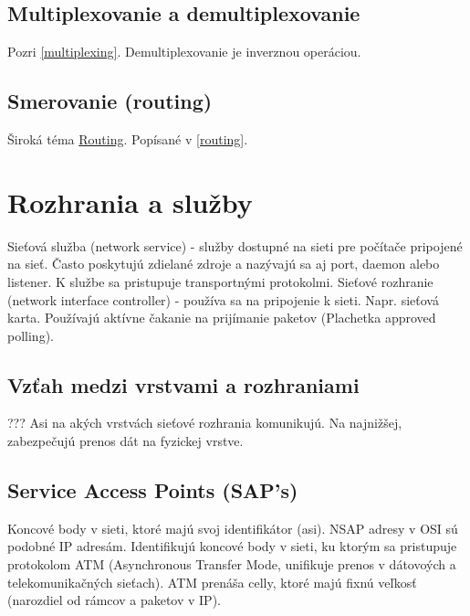 \documentclass[10pt,a4paper]{article}
\begin{document}
\subsection{Multiplexovanie a demultiplexovanie}  
Pozri \ref{multiplexing}. Demultiplexovanie je inverznou operáciou. 

\subsection{Smerovanie (routing)}   
Široká téma \href{http://en.wikipedia.org/wiki/Routing}{Routing}. 
Popísané v \ref{routing}.
              
                                                         
\section{Rozhrania a služby}                
Sieťová služba (network service) - služby dostupné na sieti pre počítače pripojené na sieť. Často poskytujú zdielané zdroje a nazývajú sa aj port, daemon alebo listener.  K službe sa pristupuje transportnými protokolmi. 
Sieťové rozhranie (network interface controller) - používa sa na pripojenie k sieti. Napr. sieťová karta. Používajú aktívne čakanie na prijímanie paketov (Plachetka approved polling). 
     
\subsection{Vzťah medzi vrstvami a rozhraniami}  
???
Asi na akých vrstvách sieťové rozhrania komunikujú. Na najnižšej, zabezpečujú prenos dát na fyzickej vrstve.  

\subsection{Service Access Points (SAP's)} 
Koncové body v sieti, ktoré majú svoj identifikátor (asi).   
NSAP adresy v OSI sú podobné IP adresám. Identifikujú koncové body v sieti, ku ktorým sa pristupuje protokolom ATM (Asynchronous Transfer Mode, unifikuje prenos v dátovoých a telekomunikačných sieťach). ATM prenáša celly, ktoré majú fixnú veľkosť (narozdiel od rámcov a paketov v IP).  
  
\end{document}
